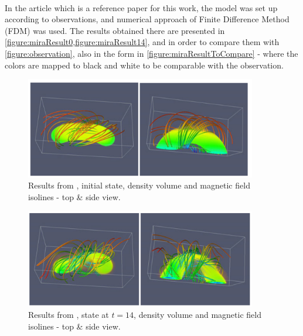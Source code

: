 \paragraph{}
In the article \cite{miraClanek} which is a reference paper for this work, the model was set up according to observations, and numerical approach of Finite Difference Method (FDM) was used. The results obtained there are presented in \cref{figure:miraResult0,figure:miraResult14}, and in order to compare them with \cref{figure:observation}, also in the form in \cref{figure:miraResultToCompare} - where the colors are mapped to black and white to be comparable with the observation.

\begin{figure}[H]
	\begin{center}
		\includegraphics[width=0.9\textwidth]{img/td-setup/fromHalpha-initialFD.jpg}
	\caption{Results from \cite{miraClanek}, initial state, density volume and magnetic field isolines - top \& side view.}
	\label{figure:miraResult0}
	\end{center}
\end{figure}

\begin{figure}[H]
	\begin{center}
		\includegraphics[width=0.9\textwidth]{img/td-setup/fromHalpha-14FD.jpg}
	\caption{Results from \cite{miraClanek}, state at $t = 14$, density volume and magnetic field isolines - top \& side view.}
	\label{figure:miraResult14}
	\end{center}
\end{figure}


